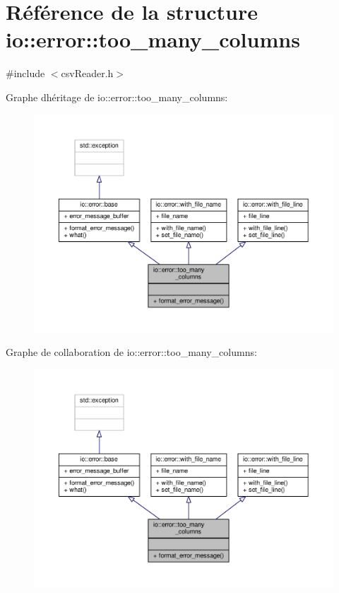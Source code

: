 \hypertarget{structio_1_1error_1_1too__many__columns}{}\section{Référence de la structure io\+:\+:error\+:\+:too\+\_\+many\+\_\+columns}
\label{structio_1_1error_1_1too__many__columns}


{\ttfamily \#include $<$csv\+Reader.\+h$>$}



Graphe d\textquotesingle{}héritage de io\+:\+:error\+:\+:too\+\_\+many\+\_\+columns\+:
\nopagebreak
\begin{figure}[H]
\begin{center}
\leavevmode
\includegraphics[width=350pt]{structio_1_1error_1_1too__many__columns__inherit__graph}
\end{center}
\end{figure}


Graphe de collaboration de io\+:\+:error\+:\+:too\+\_\+many\+\_\+columns\+:
\nopagebreak
\begin{figure}[H]
\begin{center}
\leavevmode
\includegraphics[width=350pt]{structio_1_1error_1_1too__many__columns__coll__graph}
\end{center}
\end{figure}
